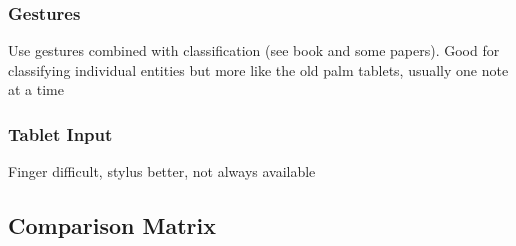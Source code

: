 \subsubsection{Gestures}

Use gestures combined with classification (see book and some papers).
Good for classifying individual entities but more like the old palm tablets, usually one note at a time


\subsubsection{Tablet Input}

Finger difficult, stylus better, not always available

\subsection{Comparison Matrix}
